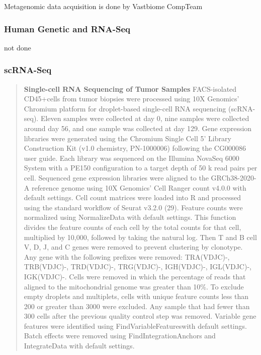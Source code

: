 \documentclass[
]{article}
\begin{document}
Metagenomic data acquisition is done by Vastbiome CompTeam

\hypertarget{human-genetic-and-rna-seq}{%
\subsubsection{Human Genetic and
RNA-Seq}\label{human-genetic-and-rna-seq}}

not done

\hypertarget{scrna-seq}{%
\subsubsection{scRNA-Seq}\label{scrna-seq}}

\begin{quote}
\textbf{Single-cell RNA Sequencing of Tumor Samples } FACS-isolated
CD45+cells from tumor biopsies were processed using 10X Genomics'
Chromium platform for droplet-based single-cell RNA sequencing
(scRNA-seq). Eleven samples were collected at day 0, nine samples were
collected around day 56, and one sample was collected at day 129. Gene
expression libraries were generated using the Chromium Single Cell 5'
Library Construction Kit (v1.0 chemistry, PN-1000006) following the
CG000086 user guide. Each library was sequenced on the Illumina NovaSeq
6000 System with a PE150 configuration to a target depth of 50 k read
pairs per cell. Sequenced gene expression libraries were aligned to the
GRCh38-2020-A reference genome using 10X Genomics' Cell Ranger count
v4.0.0 with default settings. Cell count matrices were loaded into R and
processed using the standard workflow of Seurat v3.2.0 (29). Feature
counts were normalized using NormalizeData with default settings. This
function divides the feature counts of each cell by the total counts for
that cell, multiplied by 10,000, followed by taking the natural log.
Then T and B cell V, D, J, and C genes were removed to prevent
clustering by clonotype. Any gene with the following prefixes were
removed: TRA(VDJC)-, TRB(VDJC)-, TRD(VDJC)-, TRG(VDJC)-, IGH(VDJC)-,
IGL(VDJC)-, IGK(VDJC)-. Cells were removed in which the percentage of
reads that aligned to the mitochondrial genome was greater than 10\%. To
exclude empty droplets and multiplets, cells with unique feature counts
less than 200 or greater than 3000 were excluded. Any sample that had
fewer than 300 cells after the previous quality control step was
removed. Variable gene features were identified using
FindVariableFeatureswith default settings. Batch effects were removed
using FindIntegrationAnchors and IntegrateData with default settings.

\end{quote}
\end{document}
